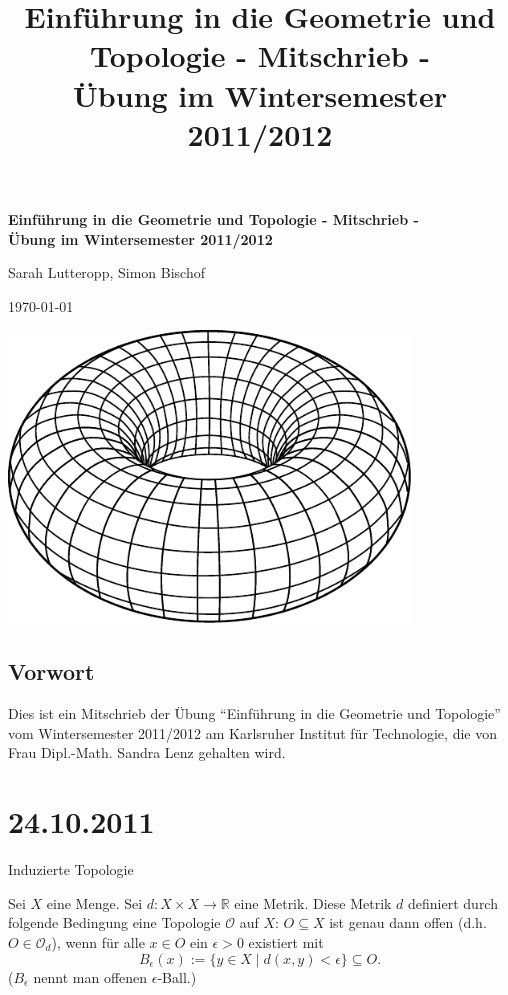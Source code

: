 \documentclass[a4paper,11pt,notitlepage]{report}
\title{\textbf{{Einführung in die Geometrie und Topologie - Mitschrieb -} \\[5ex] 
    {\Large Übung im Wintersemester 2011/2012\\[5ex]}}}
\author{\myname{Sarah Lutteropp, Simon Bischof}}
\theoremstyle{definition}
\newcommand{\R}{{\ensuremath{\mathbb{R}}}}
\newcommand{\OO}{{\ensuremath{\mathcal{O}}}}
\begin{document}
\begin{titlepage}
	\begin{center}	
		\LARGE \textbf{{Einführung in die Geometrie und Topologie - Mitschrieb -} \\[5ex] 
    		{\Large Übung im Wintersemester 2011/2012\\[5ex]}}
	\end{center}
	\begin{center}
		\Large Sarah Lutteropp, Simon Bischof
	\end{center}
	\begin{center}
		\today
	\end{center}
	\vspace{2cm}
	\begin{center}
		\includegraphics[width=0.8\textwidth]{torus2.pdf}
	\end{center}
\end{titlepage}
\setcounter{tocdepth}{1}
\tableofcontents

\section*{Vorwort}
Dies ist ein Mitschrieb der Übung “Einführung in die Geometrie und Topologie” vom Wintersemester 2011/2012 am Karlsruher Institut für Technologie, die von Frau Dipl.-Math. Sandra Lenz gehalten wird.

\chapter{24.10.2011}

\begin{section}{Induzierte Topologie}
	\begin{definition}
		Sei $X$ eine Menge. Sei $d \colon X \times X \rightarrow \R$ eine Metrik. Diese Metrik $d$ definiert durch folgende Bedingung eine Topologie $\OO$ auf $X$:
		\newline
		$O \subseteq X$ ist genau dann offen (d.h. $O \in \OO_d$), wenn für alle $x \in O$ ein $\epsilon > 0$ existiert mit
		$$
			B_\epsilon (x) := \{y \in X \mid d(x,y) < \epsilon\} \subseteq O.
		$$
		($B_\epsilon$ nennt man offenen $\epsilon$-Ball.)
	\end{definition}
\end{section}
\end{document}
